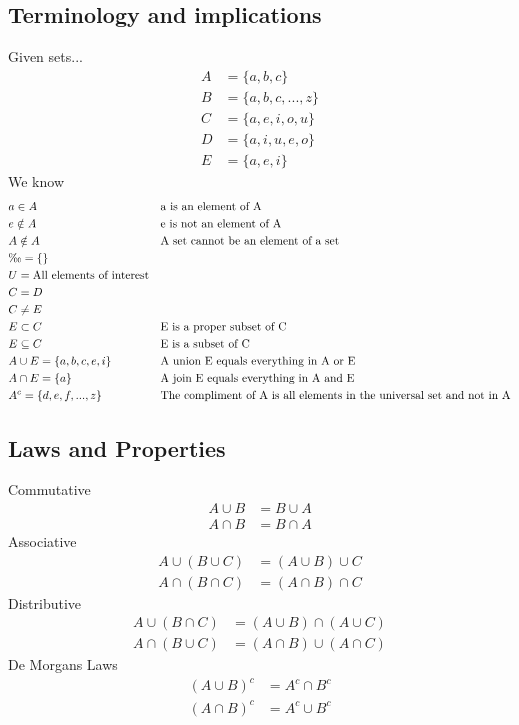 \documentclass[twocolumn]{article}
\begin{document}
	\subsection*{Terminology and implications}
	Given sets...
	\begin{align*}
		A &= \{ a, b, c \} \\
		B &= \{ a, b, c, ..., z \} \\
		C &= \{ a, e, i, o, u \} \\
		D &= \{ a, i, u, e, o \} \\
		E &= \{ a, e, i \}
	\end{align*}
	We know
	\begin{align*}
		& a \in A              & &\text{a is an element of A} \\
		& e \notin A        & &\text{e is not an element of A} \\
		& A \notin A        & &\text{A set cannot be an element of a set} \\
		& \O = \{ \}           & & \\
		& U = \text{All elements of interest} & & \\
		& C = D               && \\
		& C \neq E          & & \\
		& E \subset C     & &\text{E is a proper subset of C} \\
		& E \subseteq C & &\text{E is a subset of C} \\
		& A \cup E = \{ a, b, c, e, i \} & &\text{A union E equals everything in A or E} \\
		& A \cap E = \{ a \} & &\text{A join E equals everything in A and E} \\
		& A^c = \{ d, e, f, ..., z \} & &\text{The compliment of A is all elements in the universal set and not in A}
	\end{align*}
	
	\subsection*{Laws and Properties}
	Commutative
	\begin{align*}
		A \cup B &= B \cup A \\
		A \cap B &= B \cap A
	\end{align*}
	Associative
	\begin{align*}
		A \cup (B \cup C) &= (A \cup B) \cup C \\
		A \cap (B \cap C) &= (A \cap B) \cap C
	\end{align*}
	Distributive
	\begin{align*}
		A \cup (B \cap C) &= (A \cup B) \cap (A \cup C) \\
		A \cap (B \cup C) &= (A \cap B) \cup (A \cap C)
	\end{align*}
	De Morgans Laws
	\begin{align*}
		(A \cup B)^c &= A^c \cap B^c \\
		(A \cap B)^c &= A^c \cup B^c
	\end{align*}
	
\end{document}

